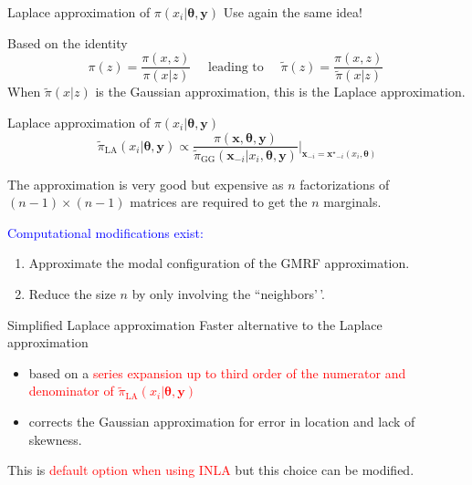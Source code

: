 \documentclass[
  ignorenonframetext,
]{beamer}
\providecommand{\tightlist}{%
  \setlength{\itemsep}{0pt}\setlength{\parskip}{0pt}}
\begin{document}
\begin{frame}{Laplace approximation of
\(\pi(x_i|\mathbf{\theta}, \mathbf{y})\)}
\protect\hypertarget{laplace-approximation-of-pix_imathbftheta-mathbfy}{}
Use again the same idea!

Based on the identity \[
\pi(z) = \frac{\pi(x,z)}{\pi(x|z)}\quad \text{ leading to }\quad \tilde{\pi}(z) = \frac{\pi(x,z)}{\tilde{\pi}(x|z)}\
\] When \(\tilde{\pi}(x|z)\) is the Gaussian approximation, this is the
Laplace approximation.
\end{frame}

\begin{frame}{Laplace approximation of
\(\pi(x_i|\mathbf{\theta}, \mathbf{y})\)}
\protect\hypertarget{laplace-approximation-of-pix_imathbftheta-mathbfy-1}{}
\[
\widetilde{\pi}_\text{LA}(x_i|\mathbf{\theta}, \mathbf{y}) \propto
            \frac{\pi(\mathbf{x}, \mathbf{\theta},\mathbf{y})}
            {\widetilde{\pi}_\text{GG}(\mathbf{x}_{-i}|x_i, \mathbf{\theta}, \mathbf{y})}
            \Biggr|_{\mathbf{x}_{-i}=\mathbf{x^\star}_{-i}(x_i, \mathbf{\theta})}
\]

The approximation is very good but expensive as \(n\) factorizations of
\((n-1) \times (n-1)\) matrices are required to get the \(n\) marginals.

\pause

\textcolor{blue}{Computational modifications exist:}

\begin{enumerate}
\tightlist
\item
  Approximate the modal configuration of the GMRF approximation.
\item
  Reduce the size \(n\) by only involving the ``neighbors'\,'.
\end{enumerate}
\end{frame}

\begin{frame}{Simplified Laplace approximation}
\protect\hypertarget{simplified-laplace-approximation}{}
Faster alternative to the Laplace approximation\\

\begin{itemize}
\tightlist
\item
  based on a \textcolor{red}{series
   expansion up to third order of the numerator and denominator of $\widetilde{\pi}_\text{LA}(x_i|\mathbf{\theta}, \mathbf{y})$}
\item
  corrects the Gaussian approximation for error in location and lack of
  skewness.
\end{itemize}

\pause

This is \textcolor{red}{default option when using INLA} but this choice
can be modified.
\end{frame}
\end{document}
